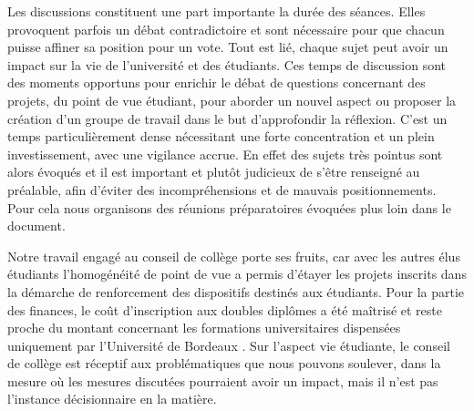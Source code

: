 \documentclass{article}
\begin{document}
Les discussions constituent une part importante la durée des séances. Elles provoquent parfois un débat contradictoire et sont nécessaire pour que chacun puisse affiner sa position pour un vote. Tout est lié, chaque sujet peut avoir un impact sur la vie de l'université et des étudiants. Ces temps de discussion sont des moments opportuns pour enrichir le débat de questions concernant des projets, du point de vue étudiant, pour aborder un nouvel aspect ou proposer la création d’un groupe de travail dans le but d'approfondir la réflexion. C’est un temps particulièrement dense nécessitant une forte concentration et un plein investissement, avec une vigilance accrue. En effet des sujets très pointus sont alors évoqués et il est important et plutôt judicieux de s'être renseigné au préalable, afin d’éviter des incompréhensions et de mauvais positionnements. Pour cela nous organisons des réunions préparatoires évoquées plus loin dans le document.

Notre travail engagé au conseil de collège porte ses fruits, car avec les autres élus étudiants l'homogénéité de point de vue a permis d’étayer les projets inscrits dans la démarche de renforcement des dispositifs destinés aux étudiants. Pour la partie des finances, le coût d'inscription aux doubles diplômes a été maîtrisé et reste proche du montant concernant les formations universitaires dispensées uniquement par l'Université de Bordeaux . Sur l'aspect vie étudiante, le conseil de collège est réceptif aux problématiques que nous pouvons soulever, dans la mesure où les mesures discutées pourraient avoir un impact, mais  il n'est pas l'instance décisionnaire en la matière.
\end{document}
